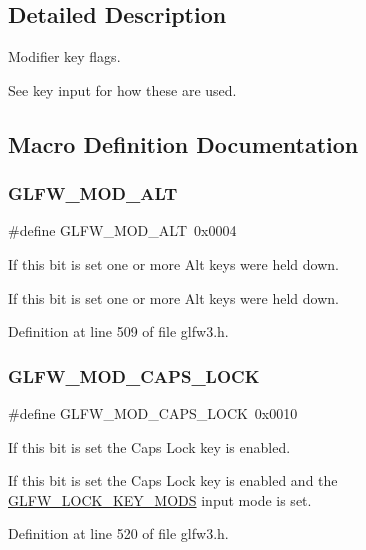 \subsection{Detailed Description}
Modifier key flags. 

See key input for how these are used. 

\subsection{Macro Definition Documentation}
\mbox{\label{group__mods_gad2acd5633463c29e07008687ea73c0f4}} 
\subsubsection{\texorpdfstring{GLFW\_MOD\_ALT}{GLFW\_MOD\_ALT}}
{\footnotesize\ttfamily \#define G\+L\+F\+W\+\_\+\+M\+O\+D\+\_\+\+A\+LT~0x0004}



If this bit is set one or more Alt keys were held down. 

If this bit is set one or more Alt keys were held down. 

Definition at line 509 of file glfw3.\+h.

\mbox{\label{group__mods_gaefeef8fcf825a6e43e241b337897200f}} 
\subsubsection{\texorpdfstring{GLFW\_MOD\_CAPS\_LOCK}{GLFW\_MOD\_CAPS\_LOCK}}
{\footnotesize\ttfamily \#define G\+L\+F\+W\+\_\+\+M\+O\+D\+\_\+\+C\+A\+P\+S\+\_\+\+L\+O\+CK~0x0010}



If this bit is set the Caps Lock key is enabled. 

If this bit is set the Caps Lock key is enabled and the \mbox{\hyperlink{glfw3_8h_a07b84de0b52143e1958f88a7d9105947}{G\+L\+F\+W\+\_\+\+L\+O\+C\+K\+\_\+\+K\+E\+Y\+\_\+\+M\+O\+DS}} input mode is set. 

Definition at line 520 of file glfw3.\+h.

